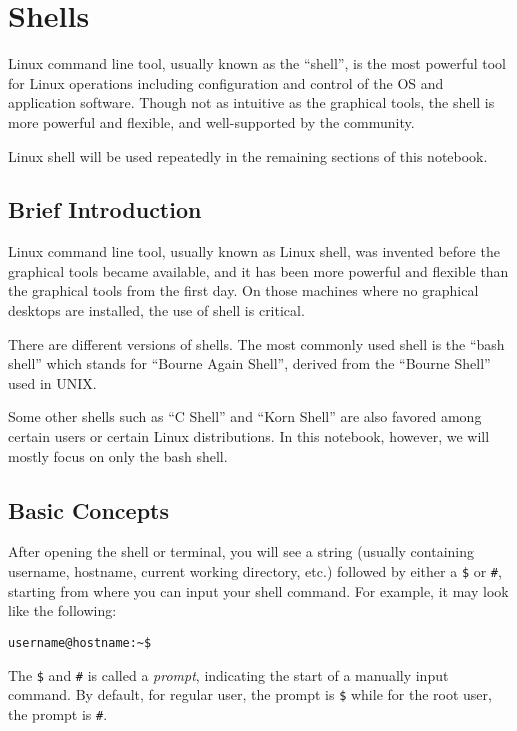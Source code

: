 \chapter{Shells}

Linux command line tool, usually known as the ``shell'', is the most powerful tool for Linux operations including configuration and control of the OS and application software. Though not as intuitive as the graphical tools, the shell is more powerful and flexible, and well-supported by the community.

Linux shell will be used repeatedly in the remaining sections of this notebook.

\section{Brief Introduction}

Linux command line tool, usually known as Linux shell, was invented before the graphical tools became available, and it has been more powerful and flexible than the graphical tools from the first day. On those machines where no graphical desktops are installed, the use of shell is critical.

There are different versions of shells. The most commonly used shell is the ``bash shell'' which stands for ``Bourne Again Shell'', derived from the ``Bourne Shell'' used in UNIX.

Some other shells such as ``C Shell'' and ``Korn Shell'' are also favored among certain users or certain Linux distributions. In this notebook, however, we will mostly focus on only the bash shell.

\section{Basic Concepts}

After opening the shell or terminal, you will see a string (usually containing username, hostname, current working directory, etc.) followed by either a \verb|$| or \verb|#|, starting from where you can input your shell command. For example, it may look like the following:
\begin{verbatim}
username@hostname:~$
\end{verbatim}

The \verb|$| and \verb|#| is called a \textit{prompt}, indicating the start of a manually input command. By default, for regular user, the prompt is \verb|$| while for the root user, the prompt is \verb|#|. 

